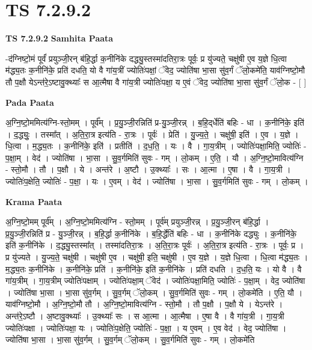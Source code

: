 \documentclass[17pt]{extarticle}
\begin{document}
\section{ TS 7.2.9.2 }

\textbf{TS 7.2.9.2 } \newline
\textbf{Samhita Paata} \newline

-द॑ग्निष्टो॒मं पूर्वं॑ प्रयुञ्जी॒रन् ब॑हि॒र्द्धा क॒नीनि॑के दद्ध्यु॒स्तस्मा॑दतिरा॒त्रः पूर्वः॒ प्र यु॑ज्यते॒ चक्षु॑षी ए॒व य॒ज्ञे धि॒त्वा म॑द्ध्य॒तः क॒नीनि॑के॒ प्रति॑ दधति॒ यो वै गा॑य॒त्रीं ज्योतिः॑पक्षां॒ ॅवेद॒ ज्योति॑षा भा॒सा सु॑व॒र्गं ॅलो॒कमे॑ति॒ याव॑ग्निष्टो॒मौ तौ प॒क्षौ येऽन्त॑रे॒ऽष्टावु॒क्थ्याः᳚ स आ॒त्मैषा वै गा॑य॒त्री ज्योतिः॑पक्षा॒ य ए॒वं ॅवेद॒ ज्योति॑षा भा॒सा सु॑व॒र्गं ॅलो॒क - [  ] \newline

\textbf{Pada Paata} \newline

अ॒ग्नि॒ष्टो॒ममित्य॑ग्नि-स्तो॒मम् । पूर्व᳚म् । प्र॒यु॒ञ्जी॒रन्निति॑ प्र-यु॒ञ्जी॒रन्न् । ब॒हि॒द्‌र्धेति॑ बहिः - धा । क॒नीनि॑के॒ इति॑ । द॒द्ध्युः॒ । तस्मा᳚त् । अ॒ति॒रा॒त्र इत्य॑ति - रा॒त्रः । पूर्वः॑ । प्रेति॑ । यु॒ज्य॒ते॒ । चक्षु॑षी॒ इति॑ । ए॒व । य॒ज्ञे । धि॒त्वा । म॒द्ध्य॒तः । क॒नीनि॑के॒ इति॑ । प्रतीति॑ । द॒ध॒ति॒ । यः । वै । गा॒य॒त्रीम् । ज्योतिः॑पक्षा॒मिति॒ ज्योतिः॑ - प॒क्षा॒म् । वेद॑ । ज्योति॑षा । भा॒सा । सु॒व॒र्गमिति॑ सुवः - गम् । लो॒कम् । ए॒ति॒ । यौ । अ॒ग्नि॒ष्टो॒मावित्य॑ग्नि - स्तो॒मौ । तौ । प॒क्षौ । ये । अन्त॑रे । अ॒ष्टौ । उ॒क्थ्याः᳚ । सः । आ॒त्मा । ए॒षा । वै । गा॒य॒त्री । ज्योतिः॑प॒क्षेति॒ ज्योतिः॑ - प॒क्षा॒ । यः । ए॒वम् । वेद॑ । ज्योति॑षा । भा॒सा । सु॒व॒र्गमिति॑ सुवः - गम् । लो॒कम् ।  \newline


\textbf{Krama Paata} \newline

अ॒ग्नि॒ष्टो॒मम् पूर्व᳚म् । अ॒ग्नि॒ष्टो॒ममित्य॑ग्नि - स्तो॒मम् । पूर्व॑म् प्रयुञ्जी॒रन्न् । प्र॒यु॒ञ्जी॒रन् ब॑हि॒र्द्धा । प्र॒यु॒ञ्जी॒रन्निति॑ प्र - यु॒ञ्जी॒रन्न् । ब॒हि॒र्द्धा क॒नीनि॑के । ब॒हि॒र्द्धेति॑ बहिः - धा । क॒नीनि॑के दद्ध्युः । क॒नीनि॑के॒ इति॑ क॒नीनि॑के । द॒द्ध्यु॒स्तस्मा᳚त् । तस्मा॑दतिरा॒त्रः । अ॒ति॒रा॒त्रः पूर्वः॑ । अ॒ति॒रा॒त्र इत्य॑ति - रा॒त्रः । पूर्वः॒ प्र । 
प्र यु॑ज्यते । यु॒ज्य॒ते॒ चक्षु॑षी । चक्षु॑षी ए॒व । चक्षु॑षी॒ इति॒ चक्षु॑षी । ए॒व य॒ज्ञे । य॒ज्ञे धि॒त्वा । धि॒त्वा म॑द्ध्य॒तः । म॒द्ध्य॒तः क॒नीनि॑के । क॒नीनि॑के॒ प्रति॑ । क॒नीनि॑के॒ इति॑ क॒नीनि॑के । प्रति॑ दधति । द॒ध॒ति॒ यः । यो वै । वै गा॑य॒त्रीम् । गा॒य॒त्रीम् ज्योतिः॑पक्षाम् । ज्योतिः॑पक्षा॒म् ॅवेद॑ । ज्योतिः॑पक्षा॒मिति॒ ज्योतिः॑ - प॒क्षा॒म् । वेद॒ ज्योति॑षा । ज्योति॑षा भा॒सा । भा॒सा सु॑व॒र्गम् । सु॒व॒र्गम् ॅलो॒कम् । सु॒व॒र्गमिति॑ सुवः - गम् । लो॒कमे॑ति । ए॒ति॒ यौ । याव॑ग्निष्टो॒मौ । अ॒ग्नि॒ष्टो॒मौ तौ । अ॒ग्नि॒ष्टो॒मावित्य॑ग्नि - स्तो॒मौ । तौ प॒क्षौ । प॒क्षौ ये । येऽन्त॑रे । अन्त॑रे॒ऽष्टौ । अ॒ष्टावु॒क्थ्याः᳚ । उ॒क्थ्याः᳚ सः । स आ॒त्मा । आ॒त्मैषा । ए॒षा वै । वै गा॑य॒त्री । गा॒य॒त्री ज्योतिः॑पक्षा । ज्योतिः॑पक्षा॒ यः । ज्योतिः॑प॒क्षेति॒ ज्योतिः॑ - प॒क्षा॒ । य ए॒वम् । ए॒व वेद॑ । वेद॒ ज्योति॑षा । ज्योति॑षा भा॒सा । भा॒सा सु॑व॒र्गम् । सु॒व॒र्गम् ॅलो॒कम् । सु॒व॒र्गमिति॑ सुवः - गम् । लो॒कमे॑ति \newline
\end{document}
